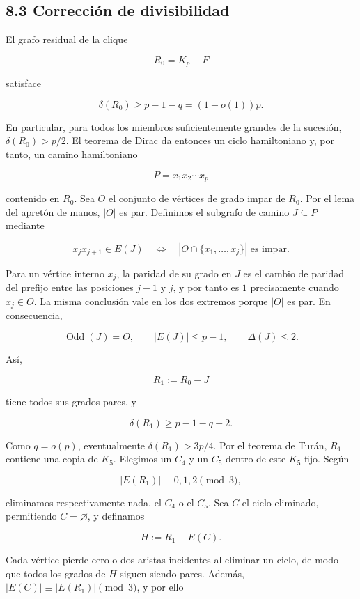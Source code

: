 \documentclass[
  11pt,
]{article}
\begin{document}
\subsection{8.3 Corrección de divisibilidad}\label{correcciuxf3n-de-divisibilidad}

El grafo residual de la clique

\[
R_0=K_p-F
\]

satisface

\[
\delta(R_0)
\ge
p-1-q
=(1-o(1))p.
\tag{8.4}
\]

En particular, para todos los miembros suficientemente grandes de la sucesión, \(\delta(R_0)>p/2\). El teorema de Dirac da entonces un ciclo hamiltoniano y, por tanto, un camino hamiltoniano

\[
P=x_1x_2\cdots x_p
\]

contenido en \(R_0\). Sea \(O\) el conjunto de vértices de grado impar de \(R_0\). Por el lema del apretón de manos, \(|O|\) es par. Definimos el subgrafo de camino \(J\subseteq P\) mediante

\[
x_jx_{j+1}\in E(J)
\quad\Longleftrightarrow\quad
|O\cap\{x_1,\ldots,x_j\}|\text{ es impar}.
\tag{8.5}
\]

Para un vértice interno \(x_j\), la paridad de su grado en \(J\) es el cambio de paridad del prefijo entre las posiciones \(j-1\) y \(j\), y por tanto es \(1\) precisamente cuando \(x_j\in O\). La misma conclusión vale en los dos extremos porque \(|O|\) es par. En consecuencia,

\[
\operatorname{Odd}(J)=O,
\qquad
|E(J)|\le p-1,
\qquad
\Delta(J)\le2.
\tag{8.6}
\]

Así,

\[
R_1:=R_0-J
\]

tiene todos sus grados pares, y

\[
\delta(R_1)\ge p-1-q-2.
\tag{8.7}
\]

Como \(q=o(p)\), eventualmente \(\delta(R_1)>3p/4\). Por el teorema de Turán, \(R_1\) contiene una copia de \(K_5\). Elegimos un \(C_4\) y un \(C_5\) dentro de este \(K_5\) fijo. Según

\[
|E(R_1)|\equiv0,1,2\pmod3,
\]

eliminamos respectivamente nada, el \(C_4\) o el \(C_5\). Sea \(C\) el ciclo eliminado, permitiendo \(C=\varnothing\), y definamos

\[
H:=R_1-E(C).
\]

Cada vértice pierde cero o dos aristas incidentes al eliminar un ciclo, de modo que todos los grados de \(H\) siguen siendo pares. Además, \(|E(C)|\equiv |E(R_1)|\pmod3\), y por ello
\end{document}
